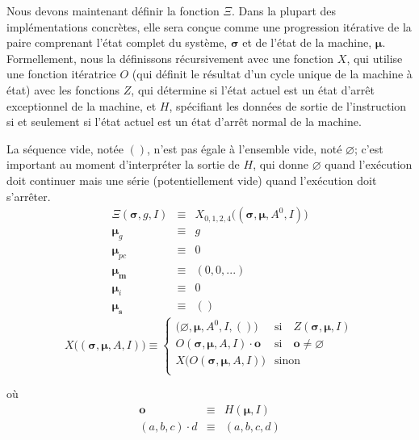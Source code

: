 \documentclass[9pt,oneside]{amsart}
\begin{document}
\begin{multicols}{2}
Nous devons maintenant définir la fonction $\Xi$. Dans la plupart des implémentations concrètes, elle sera conçue comme une progression itérative de la paire comprenant l'état complet du système, $\boldsymbol{\sigma}$ et de l'état de la machine,  $\boldsymbol{\mu}$. Formellement, nous la définissons récursivement avec une fonction $X$, qui utilise une fonction itératrice $O$ (qui définit le résultat d'un cycle unique de la machine à état) avec les fonctions $Z$, qui détermine si l'état actuel est un état d'arrêt exceptionnel de la machine, et $H$, spécifiant les données de sortie de l'instruction si et seulement si l'état actuel est un état d'arrêt normal de la machine.

La séquence vide, notée $()$, n'est pas égale à l'ensemble vide, noté $\varnothing$; c'est important au moment d'interpréter la sortie de $H$, qui donne $\varnothing$ quand l'exécution doit continuer mais une série (potentiellement vide) quand l'exécution doit s'arrêter.
\begin{eqnarray}
\Xi(\boldsymbol{\sigma}, g, I) & \equiv & X_{0,1,2,4}\big((\boldsymbol{\sigma}, \boldsymbol{\mu}, A^0, I)\big) \\
\boldsymbol{\mu}_g & \equiv & g \\
\boldsymbol{\mu}_{pc} & \equiv & 0 \\
\boldsymbol{\mu}_\mathbf{m} & \equiv & (0, 0, ...) \\
\boldsymbol{\mu}_i & \equiv & 0 \\
\boldsymbol{\mu}_\mathbf{s} & \equiv & ()
\end{eqnarray}
\begin{equation}
X\big( (\boldsymbol{\sigma}, \boldsymbol{\mu}, A, I) \big) \equiv \begin{cases}
\big(\varnothing, \boldsymbol{\mu}, A^0, I, ()\big) & \text{si} \quad Z(\boldsymbol{\sigma}, \boldsymbol{\mu}, I)\\
O(\boldsymbol{\sigma}, \boldsymbol{\mu}, A, I) \cdot \mathbf{o} & \text{si} \quad \mathbf{o} \neq \varnothing\\
X\big(O(\boldsymbol{\sigma}, \boldsymbol{\mu}, A, I)\big) & \text{sinon}\\
\end{cases}
\end{equation}

où
\begin{eqnarray}
\mathbf{o} & \equiv & H(\boldsymbol{\mu}, I) \\
(a, b, c) \cdot d & \equiv & (a, b, c, d)
\end{eqnarray}


\end{multicols}
\end{document}
